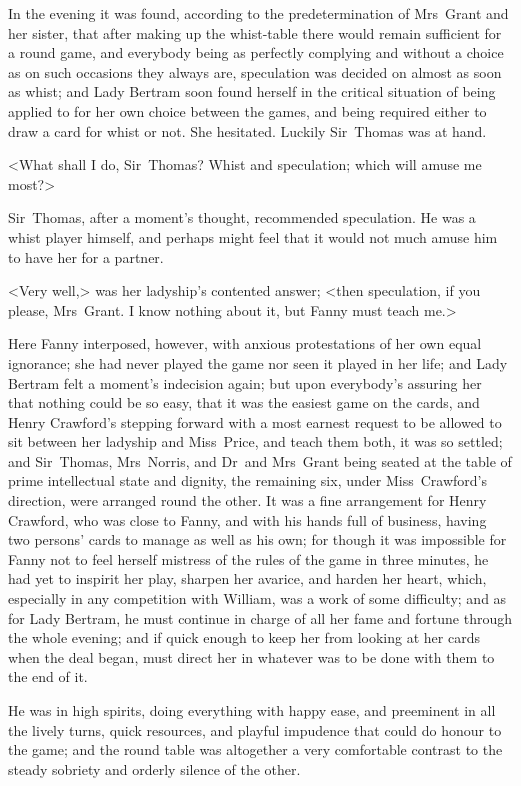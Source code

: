 In the evening it was found, according to the predetermination of Mrs~Grant and her sister, that after making up the whist-table there would remain sufficient for a round game, and everybody being as perfectly complying and without a choice as on such occasions they always are, speculation was decided on almost as soon as whist; and Lady Bertram soon found herself in the critical situation of being applied to for her own choice between the games, and being required either to draw a card for whist or not. She hesitated. Luckily Sir~Thomas was at hand.

<What shall I do, Sir~Thomas? Whist and speculation; which will amuse me most?>

Sir~Thomas, after a moment's thought, recommended speculation. He was a whist player himself, and perhaps might feel that it would not much amuse him to have her for a partner.

<Very well,> was her ladyship's contented answer; <then speculation, if you please, Mrs~Grant. I know nothing about it, but Fanny must teach me.>

Here Fanny interposed, however, with anxious protestations of her own equal ignorance; she had never played the game nor seen it played in her life; and Lady Bertram felt a moment's indecision again; but upon everybody's assuring her that nothing could be so easy, that it was the easiest game on the cards, and Henry Crawford's stepping forward with a most earnest request to be allowed to sit between her ladyship and Miss~Price, and teach them both, it was so settled; and Sir~Thomas, Mrs~Norris, and Dr~and Mrs~Grant being seated at the table of prime intellectual state and dignity, the remaining six, under Miss~Crawford's direction, were arranged round the other. It was a fine arrangement for Henry Crawford, who was close to Fanny, and with his hands full of business, having two persons' cards to manage as well as his own; for though it was impossible for Fanny not to feel herself mistress of the rules of the game in three minutes, he had yet to inspirit her play, sharpen her avarice, and harden her heart, which, especially in any competition with William, was a work of some difficulty; and as for Lady Bertram, he must continue in charge of all her fame and fortune through the whole evening; and if quick enough to keep her from looking at her cards when the deal began, must direct her in whatever was to be done with them to the end of it.

He was in high spirits, doing everything with happy ease, and preeminent in all the lively turns, quick resources, and playful impudence that could do honour to the game; and the round table was altogether a very comfortable contrast to the steady sobriety and orderly silence of the other.

